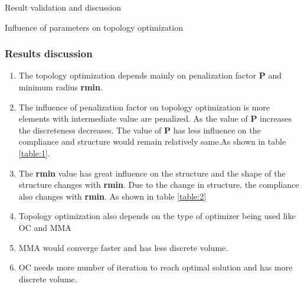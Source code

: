 \documentclass[a4paper,12pt,times]{article}
\begin{document}
\begin{section}{Result validation and discussion}
\begin{subsection}{Influence of parameters on topology optimization}
\subsubsection{Results discussion}
\begin{enumerate}
\item The topology optimization depends mainly on penalization factor \textbf{P} and minimum radius \textbf{rmin}.
\item The influence of penalization factor on topology optimization is more elements with intermediate value are penalized. As the value of \textbf{P} increases the discreteness decreases. The value of \textbf{P} has less influence on the compliance and structure would remain relatively same.As shown in table \ref{table:1}.
\item The \textbf{rmin} value has great influence on the structure and the shape of the structure changes with \textbf{rmin}. Due to the change in structure, the compliance also changes with \textbf{rmin}. As shown in table \ref{table:2}
\item Topology optimization also depends on the type of optimizer being used like OC and MMA
\item MMA would converge faster and has less discrete  volume.
\item OC needs more number of iteration to reach optimal solution and has more discrete volume.



\end{enumerate}
\end{subsection}
\end{section}
\end{document}
